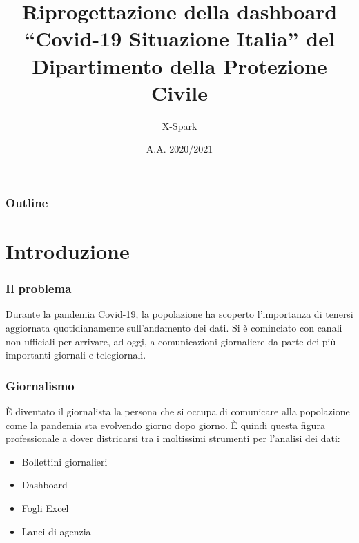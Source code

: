 \documentclass[handout]{beamer}
\title[Riprogettazione della dashboard\\``Covid-19 Situazione Italia'']{Riprogettazione della dashboard\\``Covid-19 Situazione Italia'' del Dipartimento della Protezione Civile}
\author{X-Spark}
\institute[UniBo]{LM Informatica\\
Università di Bologna - Alma Mater Studiorum}
\date{A.A. 2020/2021}
\begin{document}
	\begin{frame}[plain]
	  \titlepage
	\end{frame}
	\begin{frame}
  		\frametitle{Outline}
		\tableofcontents
	\end{frame}
	
	\section{Introduzione}

		\begin{frame}
			\frametitle{Il problema}
			Durante la pandemia Covid-19, la popolazione ha scoperto l'importanza di tenersi aggiornata quotidianamente sull'andamento dei dati.\newline \newline
			Si è cominciato con canali non ufficiali per arrivare, ad oggi, a comunicazioni giornaliere da parte dei più importanti giornali e telegiornali.
		\end{frame}

		\begin{frame}
			\frametitle{Giornalismo}
			\`E diventato il giornalista la persona che si occupa di comunicare alla popolazione come la pandemia sta evolvendo giorno dopo giorno.\newline \newline
			\`E quindi questa figura professionale  a dover districarsi tra i moltissimi strumenti per l'analisi dei dati:
			\begin{itemize}[<+->]
				\item Bollettini giornalieri\\
				\item Dashboard\\
				\item Fogli Excel\\
				\item Lanci di agenzia\\
			\end{itemize}
		\end{frame}
\end{document}
